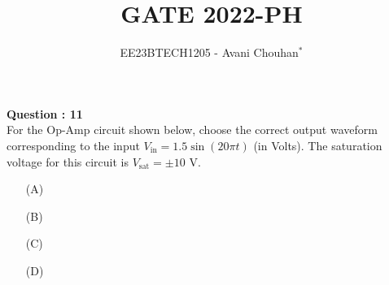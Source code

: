 \documentclass[journal,12pt,twocolumn]{IEEEtran}
\begin{document}

\vspace{3cm}

\title{GATE 2022-PH}
\author{EE23BTECH1205 - Avani Chouhan$^{*}$}
\maketitle
\bigskip

\renewcommand{\thefigure}{\theenumi}
\renewcommand{\thetable}{\theenumi}

\vspace{3cm}
\textbf{Question : 11} \\
For the Op-Amp circuit shown below, choose the correct output waveform corresponding to the input \( V_{\text{in}} = 1.5 \sin(20 \pi t) \) (in Volts). The saturation voltage for this circuit is \( V_{\text{sat}} = \pm 10 \) V.
\begin{figure}[ht]
\centering
    
    \label{fig:1}
\end{figure}
\begin{enumerate}
  \item[(A)]
  \begin{figure}[ht!]
    \centering
    
    \label{fig:ap13}
\end{figure}
  \item[(B)]  
  \begin{figure}[ht]
    \centering
    
    \label{fig:ap06}
\end{figure}
  \item[(C)] 
  \begin{figure}[ht]
    \centering
    
    \label{fig:ap03}
\end{figure}
  \item[(D)] 
   \begin{figure}[ht]
    \centering
    
    \label{fig:ap16}
\end{figure}
\end{enumerate}
\end{document}
